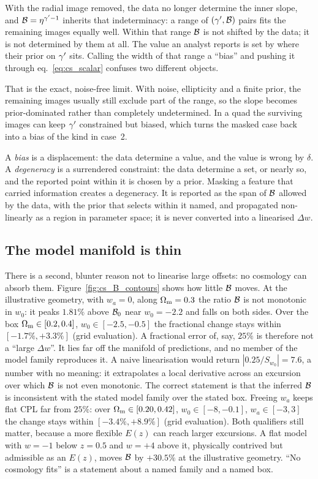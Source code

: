 With the radial image removed, the data no longer determine the inner
slope, and $\mathcal{B}=\eta^{\gamma'-1}$ inherits that indeterminacy: a range
of $(\gamma',\mathcal{B})$ pairs fits the remaining images equally well. Within
that range $\mathcal{B}$ is not shifted by the data; it is not determined by
them at all. The value an analyst reports is set by where their prior on
$\gamma'$ sits. Calling the width of that range a ``bias'' and pushing it
through eq.~\eqref{eq:cs_scalar} confuses two different objects.

That is the exact, noise-free limit. With noise, ellipticity and a
finite prior, the remaining images usually still exclude part of the
range, so the slope becomes prior-dominated rather than completely
undetermined. In a quad the surviving images can keep $\gamma'$ constrained
but biased, which turns the masked case back into a bias of the kind in
case~2.

\begin{keybox}
A \emph{bias} is a displacement: the data determine a value, and the
value is wrong by $\delta$. A \emph{degeneracy} is a surrendered
constraint: the data determine a set, or nearly so, and the reported
point within it is chosen by a prior. Masking a feature that carried
information creates a degeneracy. It is reported as the span of $\mathcal{B}$
allowed by the data, with the prior that selects within it named, and
propagated non-linearly as a region in parameter space; it is never
converted into a linearised $\Delta w$.
\end{keybox}

\subsection{The model manifold is thin}

There is a second, blunter reason not to linearise large offsets: no
cosmology can absorb them. Figure~\ref{fig:cs_B_contours} shows how
little $\mathcal{B}$ moves. At the illustrative geometry, with $w_a=0$,
along $\Omega_{\mathrm{m}}=0.3$ the ratio $\mathcal{B}$ is not monotonic in $w_0$: it
peaks $1.81\%$ above $\mathcal{B}_0$ near $w_0=-2.2$ and falls on both sides.
Over the box $\Omega_{\mathrm{m}}\in[0.2,0.4]$, $w_0\in[-2.5,-0.5]$ the fractional
change stays within $[-1.7\%,+3.3\%]$ (grid evaluation).
A fractional error of, say, $25\%$ is therefore not a ``large
$\Delta w$''. It lies far off the manifold of predictions, and no member
of the model family reproduces it. A naive linearisation would return
$|0.25/S_{w_0}|=7.6$, a number with no meaning: it extrapolates a local
derivative across an excursion over which $\mathcal{B}$ is not even monotonic.
The correct statement is that the inferred $\mathcal{B}$ is inconsistent with
the stated model family over the stated box. Freeing $w_a$ keeps flat CPL
far from $25\%$: over $\Omega_{\mathrm{m}}\in[0.20,0.42]$, $w_0\in[-8,-0.1]$,
$w_a\in[-3,3]$ the change stays within $[-3.4\%,+8.9\%]$ (grid
evaluation). Both qualifiers still matter, because a more flexible $E(z)$
can reach larger excursions. A flat model with $w=-1$ below $z=0.5$ and
$w=+4$ above it, physically contrived but admissible as an $E(z)$, moves
$\mathcal{B}$ by $+30.5\%$ at the illustrative geometry. ``No cosmology fits''
is a statement about a named family and a named box.

